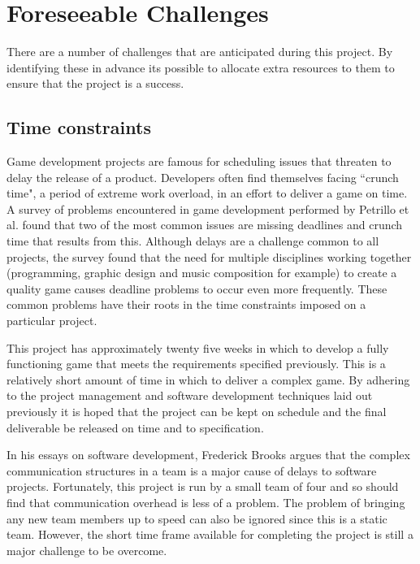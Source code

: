 \section{Foreseeable Challenges}
\label{sec:foreseeable_challenges}

There are a number of challenges that are anticipated during this project. By identifying
these in advance its possible to allocate extra resources to them to ensure that the
project is a success.

\subsection{Time constraints}

Game development projects are famous for scheduling issues that threaten to delay the
release of a product. Developers often find themselves facing ``crunch time", a period
of extreme work overload, in an effort to deliver a game on time.\cite[-1em]{groen2011}
A survey of problems encountered in game development performed by Petrillo et al. found
that two of the most common issues are missing deadlines and crunch time that results 
from this.\cite[1em]{petrillo2009} Although delays are a challenge common to all projects,
the survey found that the need for multiple disciplines working together (programming,
graphic design and music composition for example) to create a quality game causes
deadline problems to occur even more frequently. These common problems have their roots
in the time constraints imposed on a particular project.

This project has approximately twenty five weeks in which to develop a fully functioning
game that meets the requirements specified previously. This is a relatively short amount
of time in which to deliver a complex game. By adhering to the project management
and software development techniques laid out previously it is hoped that the project
can be kept on schedule and the final deliverable be released on time and to specification.

In his essays on software development, Frederick Brooks argues that the complex
communication structures in a team is a major cause of delays to software projects.\cite{brooks1995}
Fortunately, this project is run by a small team of four and so should find that
communication overhead is less of a problem. The problem of bringing any new team
members up to speed can also be ignored since this is a static team.
However, the short time frame available for completing the project is still a
major challenge to be overcome.

